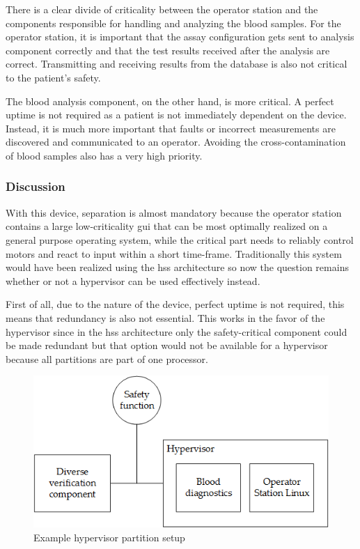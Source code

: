There is a clear divide of criticality between the operator station and the components responsible for handling and analyzing the blood samples. For the operator station, it is important that the assay configuration gets sent to analysis component correctly and that the test results received after the analysis are correct. Transmitting and receiving results from the database is also not critical to the patient's safety.

The blood analysis component, on the other hand, is more critical. A perfect uptime is not required as a patient is not immediately dependent on the device. Instead, it is much more important that faults or incorrect measurements are discovered and communicated to an operator. Avoiding the cross-contamination of blood samples also has a very high priority.

\subsubsection{Discussion}
With this device, separation is almost mandatory because the operator station contains a large low-criticality \acrshort{gui} that can be most optimally realized on a general purpose operating system, while the critical part needs to reliably control motors and react to input within a short time-frame. Traditionally this system would have been realized using the \acrshort{hss} architecture so now the question remains whether or not a hypervisor can be used effectively instead.

First of all, due to the nature of the device, perfect uptime is not required, this means that redundancy is also not essential. This works in the favor of the hypervisor since in the \acrshort{hss} architecture only the safety-critical component could be made redundant but that option would not be available for a hypervisor because all partitions are part of one processor. 

\begin{figure}
\centering
\includegraphics[scale=0.75]{Figures/blood_diagnostics_arch}
\decoRule
\caption{Example hypervisor partition setup}
\label{fig:blood_diagnostics_hv_arch}
\end{figure}

